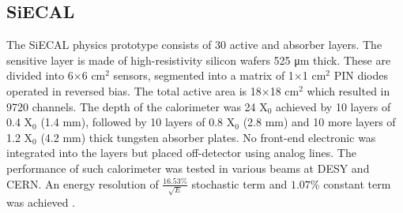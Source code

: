 \subsection{SiECAL}

The SiECAL physics prototype consists of 30 active and absorber layers. The sensitive layer is made of high-resistivity silicon wafers 525 \si{\micro\meter} thick. These are divided into 6$\times$6 cm$^2$ sensors, segmented into a matrix of 1$\times$1 cm$^2$ PIN diodes operated in reversed bias. The total active area is 18$\times$18 cm$^2$ which resulted in 9720 channels. The depth of the calorimeter was 24 X$_0$ achieved by 10 layers of 0.4 X$_0$ (1.4 mm), followed by 10 layers of 0.8 X$_0$ (2.8 mm) and 10 more layers of 1.2 X$_0$ (4.2 mm) thick tungsten absorber plates. No front-end electronic was integrated into the layers but placed off-detector using analog lines. The performance of such calorimeter was tested in various beams at DESY and CERN. An energy resolution of $\frac{16.53\%}{\sqrt{E}}$ stochastic term and $1.07\%$ constant term was achieved \cite{ADLOFF2009372}.

